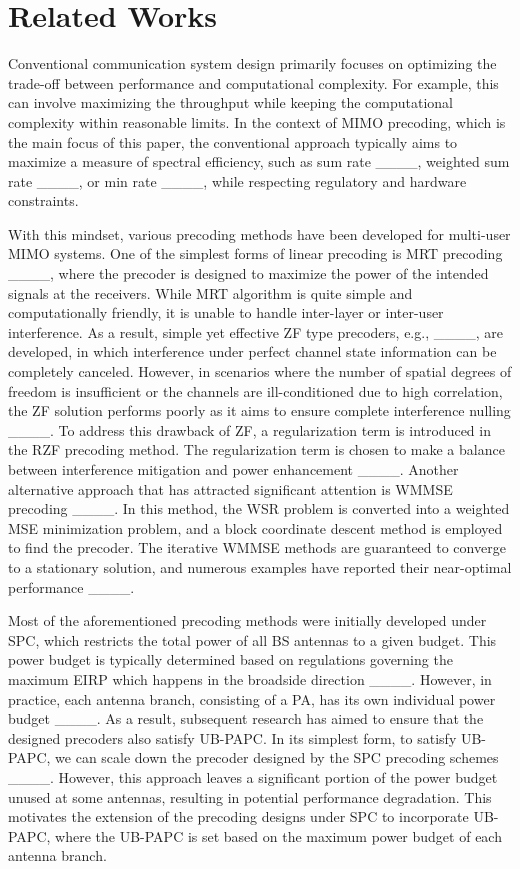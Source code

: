 \section{Related Works}
Conventional communication system design primarily focuses on optimizing the trade-off between performance and computational complexity. For example, this can involve maximizing the throughput while keeping the computational complexity within reasonable limits. In the context of MIMO precoding, which is the main focus of this paper, the conventional approach typically aims to maximize a measure of spectral efficiency, such as sum rate ____, weighted sum rate ____, or min rate ____, while respecting regulatory and hardware constraints.


With this mindset, various precoding methods have been developed for multi-user MIMO systems. One of the simplest forms of linear precoding is MRT precoding ____, where the precoder is designed to maximize the power of the intended signals at the receivers. While MRT algorithm is quite simple and computationally friendly, it is unable to handle inter-layer or inter-user interference. As a result, simple yet effective ZF type precoders, e.g., ____, are developed, in which interference under perfect channel state information can be completely canceled. However, in scenarios where the number of spatial degrees of freedom is insufficient or the channels are ill-conditioned due to high correlation, the ZF solution performs poorly as it aims to ensure complete interference nulling ____. To address this drawback of ZF, a regularization term is introduced in the RZF precoding method. The regularization term is chosen to make a balance between interference mitigation and power enhancement ____. Another alternative approach that has attracted significant attention is WMMSE precoding ____. In this method, the WSR problem is converted into a weighted MSE minimization problem, and a block coordinate descent method is employed to find the precoder. The iterative WMMSE methods are guaranteed to converge to a stationary solution, and numerous examples have reported their near-optimal performance ____.


Most of the aforementioned precoding methods were initially developed under SPC, which restricts the total power of all BS antennas to a given budget. This power budget is typically determined based on regulations governing the maximum EIRP which happens in the broadside direction ____. However, in practice, each antenna branch, consisting of a PA, has its own individual power budget ____. As a result, subsequent research has aimed to ensure that the designed precoders also satisfy UB-PAPC. In its simplest form, to satisfy UB-PAPC, we can scale down the precoder designed by the SPC precoding schemes ____. However, this approach leaves a significant portion of the power budget unused at some antennas, resulting in potential performance degradation. This motivates the extension of the precoding designs under SPC to incorporate UB-PAPC, where the UB-PAPC is set based on the maximum power budget of each antenna branch.


